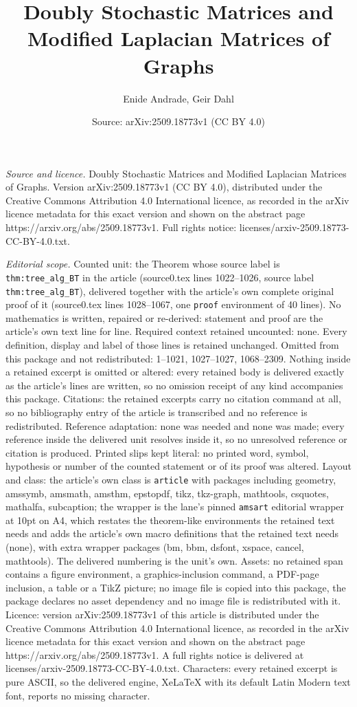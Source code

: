 \documentclass[10pt,a4paper]{amsart}
\title[Doubly Stochastic Matrices and Modified Laplacian Matrices o]{Doubly Stochastic Matrices and Modified Laplacian Matrices of Graphs}
\author{Enide Andrade, Geir Dahl}
\date{Source: arXiv:2509.18773v1 (CC BY 4.0)}
\begin{document}
\maketitle

\noindent\emph{Source and licence.} Doubly Stochastic Matrices and Modified Laplacian Matrices of Graphs. Version arXiv:2509.18773v1 (CC BY 4.0), distributed under the Creative Commons Attribution 4.0 International licence, as recorded in the arXiv licence metadata for this exact version and shown on the abstract page https://arxiv.org/abs/2509.18773v1. Full rights notice: licenses/arxiv-2509.18773-CC-BY-4.0.txt.\par\smallskip

\noindent\textit{Editorial scope.} Counted unit: the Theorem whose source label is \texttt{thm:tree\_alg\_BT} in the article (source0.tex lines 1022--1026, source label \texttt{thm:tree\_alg\_BT}), delivered together with the article's own complete original proof of it (source0.tex lines 1028--1067, one \texttt{proof} environment of 40 lines). No mathematics is written, repaired or re-derived: statement and proof are the article's own text line for line. Required context retained uncounted: none. Every definition, display and label of those lines is retained unchanged. Omitted from this package and not redistributed: 1--1021, 1027--1027, 1068--2309. Nothing inside a retained excerpt is omitted or altered: every retained body is delivered exactly as the article's lines are written, so no omission receipt of any kind accompanies this package. Citations: the retained excerpts carry no citation command at all, so no bibliography entry of the article is transcribed and no reference is redistributed. Reference adaptation: none was needed and none was made; every reference inside the delivered unit resolves inside it, so no unresolved reference or citation is produced. Printed slips kept literal: no printed word, symbol, hypothesis or number of the counted statement or of its proof was altered. Layout and class: the article's own class is \texttt{article} with packages including geometry, amssymb, amsmath, amsthm, epstopdf, tikz, tkz-graph, mathtools, csquotes, mathalfa, subcaption; the wrapper is the lane's pinned \texttt{amsart} editorial wrapper at 10pt on A4, which restates the theorem-like environments the retained text needs and adds the article's own macro definitions that the retained text needs (none), with extra wrapper packages (bm, bbm, dsfont, xspace, cancel, mathtools). The delivered numbering is the unit's own. Assets: no retained span contains a figure environment, a graphics-inclusion command, a PDF-page inclusion, a table or a TikZ picture; no image file is copied into this package, the package declares no asset dependency and no image file is redistributed with it. Licence: version arXiv:2509.18773v1 of this article is distributed under the Creative Commons Attribution 4.0 International licence, as recorded in the arXiv licence metadata for this exact version and shown on the abstract page https://arxiv.org/abs/2509.18773v1. A full rights notice is delivered at licenses/arxiv-2509.18773-CC-BY-4.0.txt. Characters: every retained excerpt is pure ASCII, so the delivered engine, XeLaTeX with its default Latin Modern text font, reports no missing character.
\end{document}
